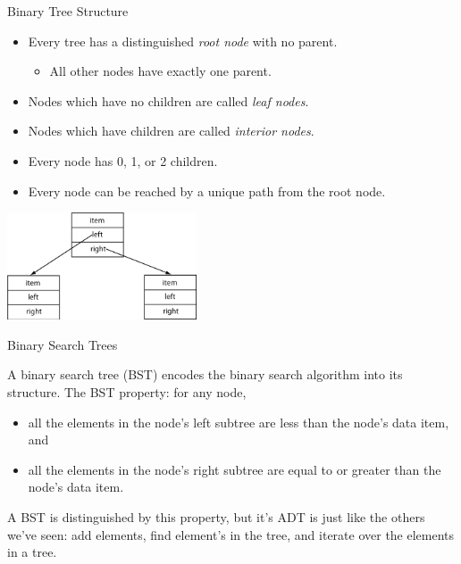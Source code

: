 \documentclass{beamer}
\begin{document}
\begin{frame}[fragile]{Binary Tree Structure}



\begin{itemize}
\item Every tree has a distinguished {\it root node} with no parent.
\begin{itemize}
\item All other nodes have exactly one parent.
\end{itemize}
\item Nodes which have no children are called {\it leaf nodes}.
\item Nodes which have children are called {\it interior nodes}.
\item Every node has 0, 1, or 2 children.
\item Every node can be reached by a unique path from the root node.
\end{itemize}

\begin{center}
\includegraphics[height=1.25in]{binary-tree.png}
\end{center}


\end{frame}

\begin{frame}[fragile]{Binary Search Trees}


A binary search tree (BST) encodes the binary search algorithm into its
structure.  The BST property: for any node,
\begin{itemize}
\item all the elements in the node's left subtree are less than the node's data item, and
\item all the elements in the node's right subtree are equal to or greater than the node's data item.
\end{itemize}

A BST is distinguished by this property, but it's ADT is just like the others we've seen: add elements, find element's in the tree, and iterate over the elements in a tree.


\end{frame}
\end{document}
